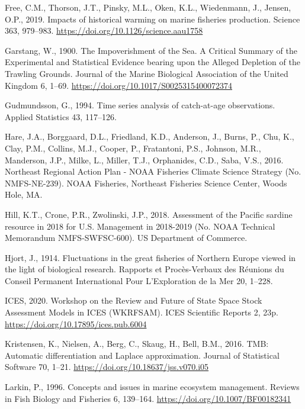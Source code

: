 \documentclass[]{article}
\begin{document}
\leavevmode\hypertarget{ref-free2019Impacts}{}%
Free, C.M., Thorson, J.T., Pinsky, M.L., Oken, K.L., Wiedenmann, J.,
Jensen, O.P., 2019. Impacts of historical warming on marine fisheries
production. Science 363, 979--983.
\url{https://doi.org/10.1126/science.aau1758}

\leavevmode\hypertarget{ref-garstang1900Impoverishment}{}%
Garstang, W., 1900. The Impoverishment of the Sea. A Critical Summary of
the Experimental and Statistical Evidence bearing upon the Alleged
Depletion of the Trawling Grounds. Journal of the Marine Biological
Association of the United Kingdom 6, 1--69.
\url{https://doi.org/10.1017/S0025315400072374}

\leavevmode\hypertarget{ref-gudmundsson1994Time}{}%
Gudmundsson, G., 1994. Time series analysis of catch-at-age
observations. Applied Statistics 43, 117--126.

\leavevmode\hypertarget{ref-hare2016Northeast}{}%
Hare, J.A., Borggaard, D.L., Friedland, K.D., Anderson, J., Burns, P.,
Chu, K., Clay, P.M., Collins, M.J., Cooper, P., Fratantoni, P.S.,
Johnson, M.R., Manderson, J.P., Milke, L., Miller, T.J., Orphanides,
C.D., Saba, V.S., 2016. Northeast Regional Action Plan - NOAA Fisheries
Climate Science Strategy (No. NMFS-NE-239). NOAA Fisheries, Northeast
Fisheries Science Center, Woods Hole, MA.

\leavevmode\hypertarget{ref-hill2018Assessment}{}%
Hill, K.T., Crone, P.R., Zwolinski, J.P., 2018. Assessment of the
Pacific sardine resource in 2018 for U.S. Management in 2018-2019 (No.
NOAA Technical Memorandum NMFS-SWFSC-600). US Department of Commerce.

\leavevmode\hypertarget{ref-hjort1914Fluctuations}{}%
Hjort, J., 1914. Fluctuations in the great fisheries of Northern Europe
viewed in the light of biological research. Rapports et Procès-Verbaux
des Réunions du Conseil Permanent International Pour L'Exploration de la
Mer 20, 1--228.

\leavevmode\hypertarget{ref-ices2020Workshop}{}%
ICES, 2020. Workshop on the Review and Future of State Space Stock
Assessment Models in ICES (WKRFSAM). ICES Scientific Reports 2, 23p.
\url{https://doi.org/10.17895/ices.pub.6004}

\leavevmode\hypertarget{ref-kristensen2016TMB}{}%
Kristensen, K., Nielsen, A., Berg, C., Skaug, H., Bell, B.M., 2016. TMB:
Automatic differentiation and Laplace approximation. Journal of
Statistical Software 70, 1--21.
\url{https://doi.org/10.18637/jss.v070.i05}

\leavevmode\hypertarget{ref-larkin1996Concepts}{}%
Larkin, P., 1996. Concepts and issues in marine ecosystem management.
Reviews in Fish Biology and Fisheries 6, 139--164.
\url{https://doi.org/10.1007/BF00182341}
\end{document}
